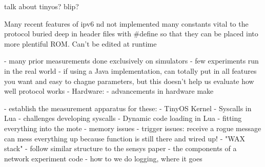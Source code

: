 talk about tinyos? blip?

Many recent features of  ipv6 nd not implemented
many constants vital to the protocol buried deep in header files with #define so that they
  can be placed into more plentiful ROM. Can't be edited at runtime
\fi

- many prior measurements done exclusively on simulators
    - few experiments run in the real world
    - if using a Java implementation, can totally put in all features you want and
      easy to chagne parameters, but this doesn't help us evaluate how well protocol works
- Hardware:
    - advancements in hardware make


- establish the measurement apparatus for these:
    - TinyOS Kernel
    - Syscalls in Lua
        - challenges developing syscalls
    - Dynamic code loading in Lua
    - fitting everything into the mote
        - memory issues
        -  trigger issues: receive a rogue message can mess everything up because function is still there and wired up!
    - "WAX stack"
        - follow similar structure to the sensys paper
        - the components of a network experiment code
        - how to we do logging, where it goes
\fi
